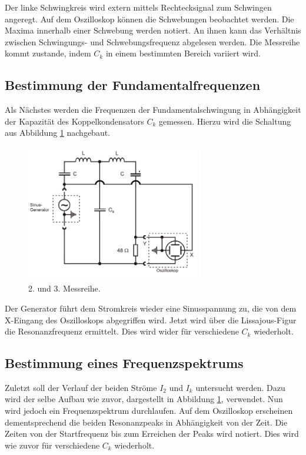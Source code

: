 Der linke Schwingkreis wird extern mittels Rechtecksignal zum Schwingen angeregt.
Auf dem Oszilloskop können die Schwebungen beobachtet werden.
Die Maxima innerhalb einer Schwebung werden notiert.
An ihnen kann das Verhältnis zwischen Schwingungs- und Schwebungsfrequenz abgelesen werden.
Die Messreihe kommt zustande, indem $C_k$ in einem bestimmten Bereich variiert wird.\\
\subsection{Bestimmung der Fundamentalfrequenzen}
\label{sec:d2}
Als Nächstes werden die Frequenzen der Fundamentalschwingung in Abhängigkeit der Kapazität des Koppelkondensators $C_k$ gemessen.
Hierzu wird die Schaltung aus Abbildung \ref{fig:5} nachgebaut.

\begin{figure}[H]
  \centering
  \includegraphics[height=6cm]{b.png}
  \caption{2. und 3. Messreihe.}
  \label{fig:5}
\end{figure}

Der Generator führt dem Stromkreis wieder eine Sinusspannung zu, die von dem X-Eingang des Oszilloskops abgegriffen wird.
Jetzt wird über die Lissajous-Figur die Resonanzfrequenz ermittelt.
Dies wird wider für verschiedene $C_k$ wiederholt.\\
\subsection{Bestimmung eines Frequenzspektrums}
\label{sec:d3}
Zuletzt soll der Verlauf der beiden Ströme $I_2$ und $I_k$ untersucht werden.
Dazu wird der selbe Aufbau wie zuvor, dargestellt in Abbildung \ref{fig:5}, verwendet.
Nun wird jedoch ein Frequenzspektrum durchlaufen.
Auf dem Oszilloskop erscheinen dementsprechend die beiden Resonanzpeaks in Abhängigkeit von der Zeit.
Die Zeiten von der Startfrequenz bis zum Erreichen der Peaks wird notiert.
Dies wird wie zuvor für verschiedene $C_k$ wiederholt.
